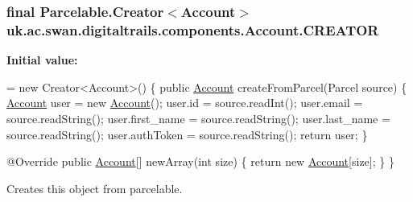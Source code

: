 \hypertarget{classuk_1_1ac_1_1swan_1_1digitaltrails_1_1components_1_1_account_a6de506f36d5240760bcd36208be882ed}{
\subsubsection[{C\+R\+E\+A\+T\+O\+R}]{\setlength{\rightskip}{0pt plus 5cm}final Parcelable.\+Creator$<${\bf Account}$>$ uk.\+ac.\+swan.\+digitaltrails.\+components.\+Account.\+C\+R\+E\+A\+T\+O\+R\hspace{0.3cm}{\ttfamily [static]}}}\label{classuk_1_1ac_1_1swan_1_1digitaltrails_1_1components_1_1_account_a6de506f36d5240760bcd36208be882ed}
{\bfseries Initial value\+:}
\begin{DoxyCode}
= \textcolor{keyword}{new} Creator<Account>() \{  
        \textcolor{keyword}{public} \hyperlink{classuk_1_1ac_1_1swan_1_1digitaltrails_1_1components_1_1_account_a2bb28b85523b20bfc58c7357309f40e0}{Account} createFromParcel(Parcel source) \{ 
            \hyperlink{classuk_1_1ac_1_1swan_1_1digitaltrails_1_1components_1_1_account_a2bb28b85523b20bfc58c7357309f40e0}{Account} user = \textcolor{keyword}{new} \hyperlink{classuk_1_1ac_1_1swan_1_1digitaltrails_1_1components_1_1_account_a2bb28b85523b20bfc58c7357309f40e0}{Account}();
            user.id = source.readInt();
            user.email = source.readString();
            user.first\_name = source.readString();
            user.last\_name = source.readString();
            user.authToken = source.readString();
            \textcolor{keywordflow}{return} user; 
        \}

        @Override
        \textcolor{keyword}{public} \hyperlink{classuk_1_1ac_1_1swan_1_1digitaltrails_1_1components_1_1_account_a2bb28b85523b20bfc58c7357309f40e0}{Account}[] newArray(\textcolor{keywordtype}{int} size) \{
            \textcolor{keywordflow}{return} \textcolor{keyword}{new} \hyperlink{classuk_1_1ac_1_1swan_1_1digitaltrails_1_1components_1_1_account_a2bb28b85523b20bfc58c7357309f40e0}{Account}[size];
        \}   
    \}
\end{DoxyCode}


Creates this object from parcelable. 



